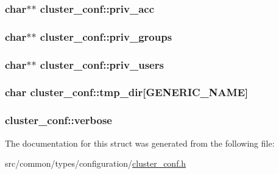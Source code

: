 \subsubsection[{\texorpdfstring{priv\+\_\+acc}{priv_acc}}]{\setlength{\rightskip}{0pt plus 5cm}char$\ast$$\ast$ cluster\+\_\+conf\+::priv\+\_\+acc}\hypertarget{structcluster__conf_a41a218b4a4b9506c63bae17074c57889}{}\label{structcluster__conf_a41a218b4a4b9506c63bae17074c57889}
\subsubsection[{\texorpdfstring{priv\+\_\+groups}{priv_groups}}]{\setlength{\rightskip}{0pt plus 5cm}char$\ast$$\ast$ cluster\+\_\+conf\+::priv\+\_\+groups}\hypertarget{structcluster__conf_a39b8cdd9c5d0411c4b90080b456a92af}{}\label{structcluster__conf_a39b8cdd9c5d0411c4b90080b456a92af}
\subsubsection[{\texorpdfstring{priv\+\_\+users}{priv_users}}]{\setlength{\rightskip}{0pt plus 5cm}char$\ast$$\ast$ cluster\+\_\+conf\+::priv\+\_\+users}\hypertarget{structcluster__conf_aada3dd05f43a80f2950dee5e783d45e0}{}\label{structcluster__conf_aada3dd05f43a80f2950dee5e783d45e0}
\subsubsection[{\texorpdfstring{tmp\+\_\+dir}{tmp_dir}}]{\setlength{\rightskip}{0pt plus 5cm}char cluster\+\_\+conf\+::tmp\+\_\+dir\mbox{[}{\bf G\+E\+N\+E\+R\+I\+C\+\_\+\+N\+A\+ME}\mbox{]}}\hypertarget{structcluster__conf_a40575ca0a8531ed7a98c356616c27fb7}{}\label{structcluster__conf_a40575ca0a8531ed7a98c356616c27fb7}
\subsubsection[{\texorpdfstring{verbose}{verbose}}]{ cluster\+\_\+conf\+::verbose}\hypertarget{structcluster__conf_a5262e1ff09faa8c205475875d07a3f34}{}\label{structcluster__conf_a5262e1ff09faa8c205475875d07a3f34}


The documentation for this struct was generated from the following file\+:\begin{DoxyCompactItemize}
\item 
src/common/types/configuration/\hyperlink{cluster__conf_8h}{cluster\+\_\+conf.\+h}\end{DoxyCompactItemize}
